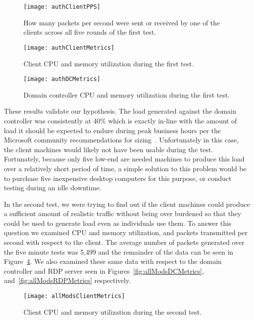 \begin{figure}[!ht] \centering
  \texttt{[image: authClientPPS]}
  \caption[Client Packets per Second]{How many packets per second were sent or
  received by one of the clients across all five rounds of the first test.}
  \label{fig:authClientPPS}
\end{figure}

\begin{figure}[!ht] \centering
  \texttt{[image: authClientMetrics]}
  \caption[Test 1:  Client Metrics]{Client CPU and memory utilization during
  the first test.}
  \label{fig:authClientMetrics}
\end{figure}

\begin{figure}[!ht] \centering
  \texttt{[image: authDCMetrics]}
  \caption[Test 1:  Domain Controller Metrics]{Domain controller CPU and memory
  utilization during the first test.}
  \label{fig:authDCMetrics}
\end{figure}

These results validate our hypothesis.  The load generated against the domain
controller was consistently at 40\% which is exactly in-line with the amount of
load it should be expected to endure during peak business hours per the
Microsoft community recommendations for sizing~\cite{mak12}.  Unfortunately in
this case, the client machines would likely not have been usable during the
test.  Fortunately, because only five low-end are needed machines to produce
this load over a relatively short period of time, a simple solution to this
problem would be to purchase five inexpensive desktop computers for this
purpose, or conduct testing during an idle downtime.

In the second test, we were trying to find out if the client machines could
produce a sufficient amount of realistic traffic without being over burdened so
that they could be used to generate load even as individuals use them.  To
answer this question we examined CPU and memory utilization, and packets
transmitted per second with respect to the client.  The average number of
packets generated over the five minute tests was 5,499 and the remainder of
the data can be seen in Figure~\ref{fig:allModsClientMetrics}.  We also
examined these same data with respect to the domain controller and RDP server
seen in Figures~\ref{fig:allModsDCMetrics}, and~\ref{fig:allModsRDPMetrics}
respectively.

\begin{figure}[!ht] \centering
  \texttt{[image: allModsClientMetrics]}
  \caption[Test 2:  Client Metrics]{Client CPU and memory utilization during
  the second test.}
  \label{fig:allModsClientMetrics}
\end{figure}

